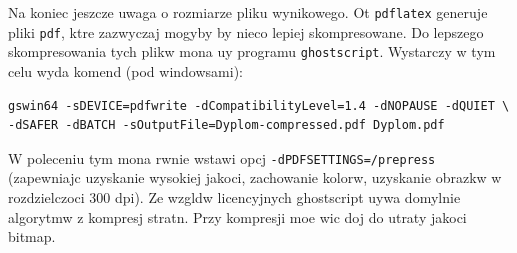 Na koniec jeszcze uwaga o rozmiarze pliku wynikowego. Ot \texttt{pdflatex} generuje pliki \texttt{pdf}, ktre zazwyczaj mogyby by nieco lepiej
skompresowane. Do lepszego skompresowania tych plikw mona uy programu \texttt{ghostscript}. Wystarczy w tym celu wyda komend (pod windowsami):
\begin{lstlisting}[basicstyle=\footnotesize\ttfamily]
gswin64 -sDEVICE=pdfwrite -dCompatibilityLevel=1.4 -dNOPAUSE -dQUIET \
-dSAFER -dBATCH -sOutputFile=Dyplom-compressed.pdf Dyplom.pdf
\end{lstlisting}
W poleceniu tym mona rwnie wstawi opcj \texttt{-dPDFSETTINGS=/prepress} (zapewniajc uzyskanie wysokiej jakoci, zachowanie kolorw, uzyskanie obrazkw w rozdzielczoci 300 dpi). Ze wzgldw licencyjnych ghostscript uywa domylnie algorytmw z kompresj stratn. Przy kompresji moe wic doj do utraty jakoci bitmap.
